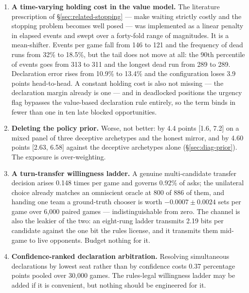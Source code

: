 \documentclass[11pt]{article}
\theoremstyle{definition}
\providecommand{\numHoldEventsBefore}{146}
\providecommand{\numHoldEventsAfter}{121}
\providecommand{\numHoldRunGamesBefore}{32}
\providecommand{\numHoldRunGamesAfter}{18.5}
\providecommand{\numHoldPninetyBefore}{313}
\providecommand{\numHoldPninetyAfter}{311}
\providecommand{\numHoldLongestBefore}{289}
\providecommand{\numHoldLongestAfter}{289}
\providecommand{\numHoldDeclBefore}{10.9}
\providecommand{\numHoldDeclAfter}{13.4}
\providecommand{\numHoldLoss}{3.9}
\providecommand{\numAgnosticCost}{4.4}
\providecommand{\numAgnosticCI}{1.6, 7.2}
\providecommand{\numArbCost}{0.37}
\providecommand{\numArbGames}{30{,}000}
\providecommand{\numTransferRate}{0.148}
\providecommand{\numTransferOracle}{800}
\providecommand{\numTransferOracleN}{886}
\providecommand{\numTransferValue}{-0.0007}
\providecommand{\numTransferSE}{0.0024}
\providecommand{\numLadderLeak}{2.19}
\providecommand{\numTransferAskShare}{0.92}
\providecommand{\numTransferGames}{6{,}000}
\providecommand{\numPriorDeleteCI}{2.63, 6.58}
\providecommand{\numPriorDeleteCost}{4.60}
\begin{document}
\begin{enumerate}
  \item \textbf{A time-varying holding cost in the value model.} The literature
        prescription of \S\ref{sec:related-stopping} --- make waiting strictly
        costly and the stopping problem becomes well posed
        \cite{mguni-actioncost} --- was implemented as a linear penalty in
        elapsed events and swept over a forty-fold range of magnitudes. It is a
        mean-shifter. Events per game fall from \numHoldEventsBefore{} to
        \numHoldEventsAfter{} and the frequency of dead runs from
        \numHoldRunGamesBefore\% to \numHoldRunGamesAfter\%, but the tail does
        not move at all: the 90th percentile of events goes from
        \numHoldPninetyBefore{} to \numHoldPninetyAfter{} and the longest dead
        run from \numHoldLongestBefore{} to \numHoldLongestAfter{}. Declaration
        error rises from \numHoldDeclBefore\% to \numHoldDeclAfter\% and the
        configuration loses \numHoldLoss{} points head-to-head. A constant holding cost is
        also not missing --- the declaration margin already is one --- and in
        deadlocked positions the urgency flag bypasses the value-based
        declaration rule entirely, so the term binds in fewer than one in ten
        late blocked opportunities.
  \item \textbf{Deleting the policy prior.} Worse, not better: by
        \numAgnosticCost{} points [\numAgnosticCI] on a mixed panel of three
        deceptive archetypes and the honest mirror, and by
        \numPriorDeleteCost{} points [\numPriorDeleteCI] against the deceptive
        archetypes alone (\S\ref{sec:diag-prior}). The exposure is
        over-weighting.
  \item \textbf{A turn-transfer willingness ladder.} A genuine multi-candidate
        transfer decision arises \numTransferRate{} times per game and governs
        \numTransferAskShare\% of asks; the unilateral choice already matches an omniscient
        oracle at \numTransferOracle{} of \numTransferOracleN{} of them, and
        handing one team a ground-truth chooser is worth
        $\numTransferValue \pm \numTransferSE$ sets per game over \numTransferGames{}
        paired games --- indistinguishable from zero. The channel is also the leakier of
        the two: an eight-rung ladder transmits \numLadderLeak{} bits per
        candidate against the one bit the rules license, and it transmits them
        mid-game to live opponents. Budget nothing for it.
  \item \textbf{Confidence-ranked declaration arbitration.} Resolving
        simultaneous declarations by lowest seat rather than by confidence costs
        \numArbCost{} percentage points pooled over \numArbGames{} games. The
        rules-legal willingness ladder may be added if it is convenient, but
        nothing should be engineered for it.
\end{enumerate}
\end{document}
